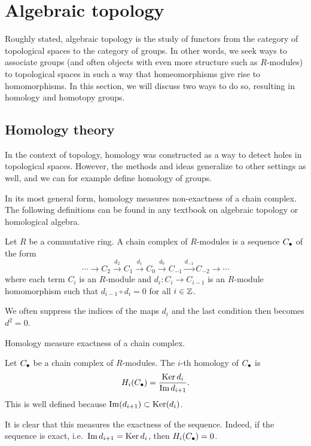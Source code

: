 \section*{Algebraic topology}

Roughly stated, algebraic topology is the study of functors from the category of topological spaces to the category of groups.
In other words, we seek ways to associate groups (and often objects with even more structure such as $R$-modules) to topological spaces in such a way that homeomorphisms give rise to homomorphisms.
In this section, we will discuss two ways to do so, resulting in homology and homotopy groups.

\subsection*{Homology theory}

In the context of topology, homology was constructed as a way to detect holes in topological spaces.
However, the methods and ideas generalize to other settings as well, and we can for example define homology of groups.

In its most general form, homology measures non-exactness of a chain complex.
The following definitions can be found in any textbook on algebraic topology or homological algebra.

\begin{definition}
    Let $R$ be a commutative ring.
    A chain complex of $R$-modules is a sequence $C_\bullet$ of the form
    \[
    \cdots \to  C_2 \xrightarrow{d_2}  C_1 \xrightarrow{d_1} C_0 \xrightarrow{d_0} C_{-1} \xrightarrow{d_{-1}}   C_{-2} \to  \cdots
    \] 
    where each term $C_i$ is an $R$-module and $d_i: C_i \to  C_{i-1}$ is an $R$-module homomorphism such that $d_{i-1}  \circ  d_i = 0$  for all $i \in \mathbb{Z}$.
\end{definition}
We often suppress the indices of the maps $d_i$ and the last condition then becomes $d^2 = 0$.

\begin{marginfigure}
    \centering
    \caption{Homology measure exactness of a chain complex.}
    \label{fig:homology-definition}
\end{marginfigure}

\begin{definition}[Homology]
    Let $C_\bullet$ be a chain complex of  $R$-modules. The $i$-th homology of $C_\bullet$ is
     \[
         H_i(C_\bullet) = \frac{\operatorname{Ker} d_i}{\operatorname{Im} d_{i+1}}
    .\] 
    This is well defined because $\operatorname{Im}(d_{i+1}) \subset \operatorname{Ker} (d_i)$.
\end{definition}
It is clear that this measures the exactness of the sequence. Indeed, if the sequence is exact, i.e.\ $\operatorname{Im} d_{i+1} = \operatorname{Ker} d_i$, then $H_i(C_\bullet) = 0$.

